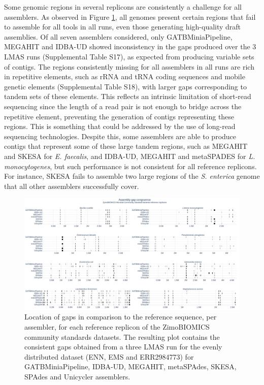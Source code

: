 Some genomic regions in several replicons are consistently a challenge for all assemblers. As observed in Figure \ref{fig:chap5_figure8}, all genomes present certain regions that fail to assemble for all tools in all runs, even those generating high-quality draft assemblies. Of all seven assemblers considered, only GATBMiniaPipeline, MEGAHIT and IDBA-UD showed inconsistency in the gaps produced over the 3 LMAS runs (Supplemental Table S17), as expected from producing variable sets of contigs. The regions consistently missing for all assemblers in all runs are rich in repetitive elements, such as rRNA and tRNA coding sequences and mobile genetic elements (Supplemental Table S18), with larger gaps corresponding to tandem sets of these elements. This reflects an intrinsic limitation of short-read sequencing since the length of a read pair is not enough to bridge across the repetitive element, preventing the generation of contigs representing these regions. This is something that could be addressed by the use of long-read sequencing technologies. Despite this, some assemblers are able to produce contigs that represent some of these large tandem regions, such as MEGAHIT and SKESA for \textit{E. faecalis}, and IDBA-UD, MEGAHIT and metaSPADES for \textit{L. monocytogenes}, but such performance is not consistent for all reference replicons. For instance, SKESA fails to assemble two large regions of the \textit{S. enterica} genome that all other assemblers successfully cover.

\begin{figure}[h!]
\centering
\includegraphics[width=\textwidth]{figures/chapter 5/Figure 8.png}
\caption{Location of gaps in comparison to the reference sequence, per assembler, for each reference replicon of the ZimoBIOMICS community standards datasets. The resulting plot contains the consistent gaps obtained from a three LMAS run for the evenly distributed dataset (ENN, EMS and ERR2984773) for GATBMiniaPipeline, IDBA-UD, MEGAHIT, metaSPAdes, SKESA, SPAdes and Unicycler assemblers.}
\label{fig:chap5_figure8}
\end{figure}

